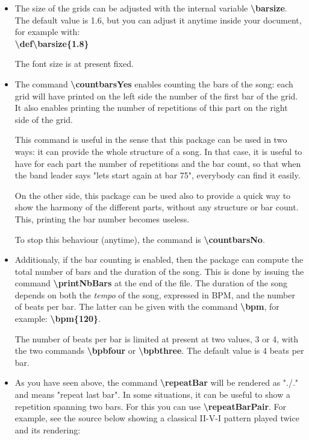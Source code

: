 \documentclass[11pt]{article}
\newcommand{\btt}{\bfseries \ttfamily }
\newcommand{\tbs}{\textbackslash{}}
\begin{document}
\begin{itemize}

\item The size of the grids can be adjusted with the internal variable 
{\btt \tbs barsize}.
The default value is 1.6, but you can adjust it anytime inside your document, for example with:\\
{\btt \tbs def\tbs barsize\{1.8\}}

The font size is at present fixed.

\item The command {\btt \tbs countbarsYes} enables counting the bars of the song:
each grid will have printed on the left side the number of the first bar of the grid.
It also enables printing the number of repetitions of this part on the right side of the grid.

This command is useful in the sense that this package can be used in two ways:
it can provide the whole structure of a song.
In that case, it is useful to have for each part the number of repetitions and the bar count, so that when the band leader says "lets start again at bar 75", everybody can find it easily.

On the other side, this package can be used also to provide a quick way to show the harmony of the different parts, without any structure or bar count.
This, printing the bar number becomes useless.

To stop this behaviour (anytime), the command is {\btt \tbs countbarsNo}.

\item Additionaly, if the bar counting is enabled, then the package can compute the total number of bars and the duration of the song.
This is done by issuing the command {\btt \tbs printNbBars} at the end of the file.
The duration of the song depends on both the {\em tempo} of the song, expressed in BPM, and the number of beats per bar.
The latter can be given with the command {\btt \tbs bpm}, for example:
{\btt \tbs bpm\{120\}}.

The number of beats per bar is limited at present at two values, 3 or 4, with the two commands
{\btt \tbs bpbfour} or {\btt \tbs bpbthree}.
The default value is 4 beats per bar.

\item As you have seen above, the command {\btt \tbs repeatBar} will be rendered as "./."
and means "repeat last bar".
In some situations, it can be useful to show a repetition spanning two bars.
For this you can use {\btt \tbs repeatBarPair}.
For example, see the source below showing a classical II-V-I pattern played twice and its rendering:


\end{itemize}
\end{document}
